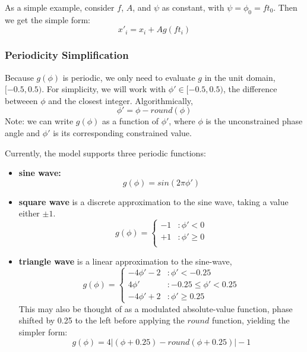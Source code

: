 \documentclass[11pt,fleqn]{report}
\begin{document}
As a simple example, consider $f$, $A$, and $\psi$ as constant, with $\psi =
\phi_0 = f t_0$.
Then we get the simple form:
\begin{equation*}
  x'_i = x_i + A g(f t_i)
\end{equation*}

\subsubsection{Periodicity Simplification}
Because $g(\phi)$ is periodic, we only need to evaluate $g$ in the unit domain,
$[-0.5, 0.5)$. For simplicity, we will work with
$\phi' \in [-0.5,0.5)$,
the difference betweeen $\phi$ and the closest integer. Algorithmically,
\begin {equation*}
  \phi' = \phi - round(\phi)
\end {equation*}
Note: we can write $g(\phi)$ as a function of $\phi'$, where $\phi$ is the
unconstrained phase angle and $\phi'$ is its corresponding constrained
value.

Currently, the model supports three periodic functions:
\begin{itemize}
  \item \textbf{sine wave:}
    \begin{equation*}
      g(\phi) = sin(2 \pi \phi')
    \end{equation*}

 \item \textbf{square wave} is a discrete approximation to the sine wave,
    taking a value either $\pm 1$.
    \begin{equation*}
      g(\phi) = \left\{ \begin{array}{ll}
                 -1 & : \phi' < 0 \\
                 +1 & : \phi' \geq 0 \\
                \end{array} \right.
    \end{equation*}

  \item \textbf{triangle wave} is a linear approximation to the sine-wave,
    \begin{equation*}
      g(\phi) = \left\{ \begin{array}{ll}
                       -4 \phi' - 2  & : \phi' < -0.25 \ \\
                        4 \phi'      & : -0.25 \leq \phi' < 0.25 \\
                       -4 \phi' + 2  & : \phi' \geq 0.25
                     \end{array} \right.
    \end{equation*}
    This may also be thought of as a modulated absolute-value function, phase
    shifted by 0.25 to the left before applying the $round$ function,
    yielding the simpler form:
    \begin{equation*}
      g(\phi) = 4 |(\phi +0.25) - round( \phi+0.25) | -1
    \end{equation*}
\end{itemize}
\end{document}
